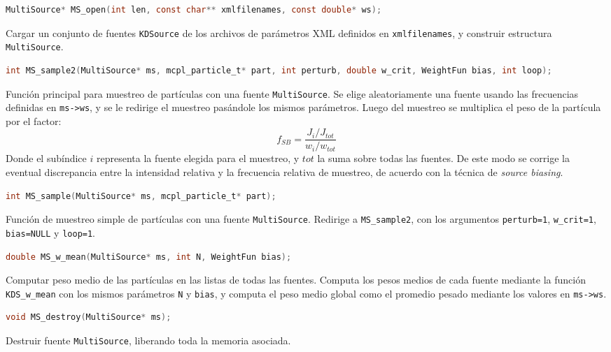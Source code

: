 \begin{footnotesize}
\begin{lstlisting}[language=C]
MultiSource* MS_open(int len, const char** xmlfilenames, const double* ws);
\end{lstlisting}
\begin{addmargin}[0.5cm]{0cm}
Cargar un conjunto de fuentes \verb|KDSource| de los archivos de parámetros XML definidos en \verb|xmlfilenames|, y construir estructura \verb|MultiSource|.
\end{addmargin}

\begin{lstlisting}[language=C]
int MS_sample2(MultiSource* ms, mcpl_particle_t* part, int perturb, double w_crit, WeightFun bias, int loop);
\end{lstlisting}
\begin{addmargin}[0.5cm]{0cm}
Función principal para muestreo de partículas con una fuente \verb|MultiSource|. Se elige aleatoriamente una fuente usando las frecuencias definidas en \verb|ms->ws|, y se le redirige el muestreo pasándole los mismos parámetros. Luego del muestreo se multiplica el peso de la partícula por el factor:
\begin{equation}
	f_{SB} = \frac{J_i / J_{tot}}{w_i / w_{tot}}
\end{equation}
Donde el subíndice $i$ representa la fuente elegida para el muestreo, y $tot$ la suma sobre todas las fuentes. De este modo se corrige la eventual discrepancia entre la intensidad relativa y la frecuencia relativa de muestreo, de acuerdo con la técnica de \emph{source biasing}.
\end{addmargin}

\begin{lstlisting}[language=C]
int MS_sample(MultiSource* ms, mcpl_particle_t* part);
\end{lstlisting}
\begin{addmargin}[0.5cm]{0cm}
Función de muestreo simple de partículas con una fuente \verb|MultiSource|. Redirige a \verb|MS_sample2|, con los argumentos \verb|perturb=1|, \verb|w_crit=1|, \verb|bias=NULL| y \verb|loop=1|.
\end{addmargin}

\begin{lstlisting}[language=C]
double MS_w_mean(MultiSource* ms, int N, WeightFun bias);
\end{lstlisting}
\begin{addmargin}[0.5cm]{0cm}
Computar peso medio de las partículas en las listas de todas las fuentes. Computa los pesos medios de cada fuente mediante la función \verb|KDS_w_mean| con los mismos parámetros \verb|N| y \verb|bias|, y computa el peso medio global como el promedio pesado mediante los valores en \verb|ms->ws|.
\end{addmargin}

\begin{lstlisting}[language=C]
void MS_destroy(MultiSource* ms);
\end{lstlisting}
\begin{addmargin}[0.5cm]{0cm}
Destruir fuente \verb|MultiSource|, liberando toda la memoria asociada.
\end{addmargin}

\end{footnotesize}


